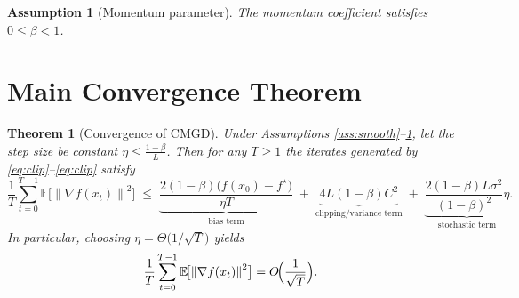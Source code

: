 \documentclass{article}
\newtheorem{theorem}{Theorem}
\newtheorem{assumption}{Assumption}
\newcommand{\EE}{\mathbb{E}}
\newcommand{\norm}[1]{\left\lVert#1\right\rVert}
\newcommand{\grad}{\nabla}
\begin{document}
\begin{assumption}[Momentum parameter]\label{ass:beta}
The momentum coefficient satisfies $0\le\beta<1$.
\end{assumption}

\section*{Main Convergence Theorem}
\begin{theorem}[Convergence of CMGD]\label{thm:convergence}
Under Assumptions \ref{ass:smooth}–\ref{ass:beta}, let the step size be constant
$\eta\le\frac{1-\beta}{L}$. Then for any $T\ge 1$ the iterates generated by
\eqref{eq:clip}–\eqref{eq:clip} satisfy
\[
\frac{1}{T}\sum_{t=0}^{T-1}\EE\!\bigl[\norm{\grad f(x_t)}^2\bigr]
\;\le\;
\underbrace{\frac{2(1-\beta)\bigl(f(x_0)-f^\star\bigr)}{\eta T}}_{\text{bias term}}
\;+\;
\underbrace{4L(1-\beta)C^2}_{\text{clipping/variance term}}
\;+\;
\underbrace{\frac{2(1-\beta)L\sigma^2}{(1-\beta)^2} \eta}_{\text{stochastic term}} .
\]
In particular, choosing $\eta = \Theta\!\bigl(1/\sqrt{T}\bigr)$ yields
\[
\frac{1}{T}\sum_{t=0}^{T-1}\EE\!\bigl[\norm{\grad f(x_t)}^2\bigr]
= O\!\Bigl(\frac{1}{\sqrt{T}}\Bigr).
\]
\end{theorem}
\end{document}
